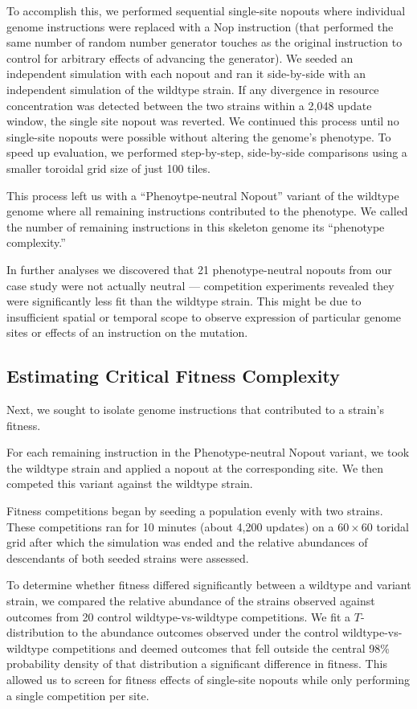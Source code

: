 To accomplish this, we performed sequential single-site nopouts where individual genome instructions were replaced with a Nop instruction (that performed the same number of random number generator touches as the original instruction to control for arbitrary effects of advancing the generator).
We seeded an independent simulation with each nopout and ran it side-by-side with an independent simulation of the wildtype strain.
If any divergence in resource concentration was detected between the two strains within a 2,048 update window, the single site nopout was reverted.  
We continued this process until no single-site nopouts were possible without altering the genome's phenotype.
To speed up evaluation, we performed step-by-step, side-by-side comparisons using a smaller toroidal grid size of just 100 tiles.

This process left us with a ``Phenoytpe-neutral Nopout'' variant of the wildtype genome where all remaining instructions contributed to the phenotype.
We called the number of remaining instructions in this skeleton genome its ``phenotype complexity.''

In further analyses we discovered that 21 phenotype-neutral nopouts from our case study were not actually neutral --- competition experiments revealed they were significantly less fit than the wildtype strain.
This might be due to insufficient spatial or temporal scope to observe expression of particular genome sites or effects of an instruction on the mutation.

\subsection{Estimating Critical Fitness Complexity}

Next, we sought to isolate genome instructions that contributed to a strain's fitness.

For each remaining instruction in the Phenotype-neutral Nopout variant, we took the wildtype strain and applied a nopout at the corresponding site.
We then competed this variant against the wildtype strain. 

Fitness competitions began by seeding a population evenly with two strains.
These competitions ran for 10 minutes (about 4,200 updates) on a $60\times60$ toridal grid after which the simulation was ended and the relative abundances of descendants of both seeded strains were assessed.

To determine whether fitness differed significantly between a wildtype and variant strain, we compared the relative abundance of the strains observed against outcomes from 20 control wildtype-vs-wildtype competitions.
We fit a $T$-distribution to the abundance outcomes observed under the control wildtype-vs-wildtype competitions and deemed outcomes that fell outside the central 98\% probability density of that distribution a significant difference in fitness.
This allowed us to screen for fitness effects of single-site nopouts while only performing a single competition per site.

